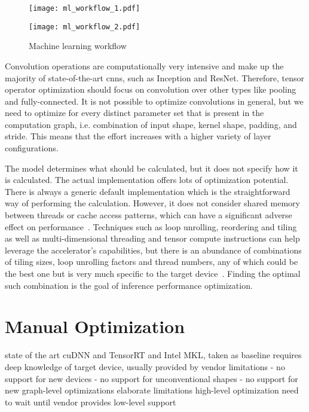 \begin{figure}
	\begin{minipage}[b]{.5\textwidth}
		\centering\texttt{[image: ml\_workflow\_1.pdf]}
		\label{fig:ml-workflow-old}
	\end{minipage}%
	\begin{minipage}[b]{.5\textwidth}
		\centering\texttt{[image: ml\_workflow\_2.pdf]}
		\label{fig:ml-workflow-new}
	\end{minipage}
	\caption[Traditional vs. optimized machine learning workflow]{Machine learning workflow}
	\label{fig:ml-workflow}
\end{figure}

Convolution operations are computationally very intensive and make up the majority of state-of-the-art \glspl{cnn}, such as Inception\cite{Szegedy.2015} and ResNet\cite{He.2015}. Therefore, tensor operator optimization should focus on convolution over other types like pooling and fully-connected. It is not possible to optimize convolutions in general, but we need to optimize for every distinct parameter set that is present in the computation graph, i.e. combination of input shape, kernel shape, padding, and stride. This means that the effort increases with a higher variety of layer configurations.

The model determines what should be calculated, but it does not specify how it is calculated. The actual implementation offers lots of optimization potential. There is always a generic default implementation which is the straightforward way of performing the calculation. However, it does not consider shared memory between threads or cache access patterns, which can have a significant adverse effect on performance~\cite{Hu.2017}. Techniques such as loop unrolling, reordering and tiling as well as multi-dimensional threading and tensor compute instructions can help leverage the accelerator's capabilities, but there is an abundance of combinations of tiling sizes, loop unrolling factors and thread numbers, any of which could be the best one but is very much specific to the target device~\cite[p.~2]{Chen.2018b}. Finding the optimal such combination is the goal of inference performance optimization.

\section{Manual Optimization}
state of the art cuDNN and TensorRT and Intel MKL, taken as baseline
requires deep knowledge of target device, usually provided by vendor
limitations
- no support for new devices
- no support for unconventional shapes
- no support for new graph-level optimizations
elaborate limitations
high-level optimization need to wait until vendor provides low-level support


